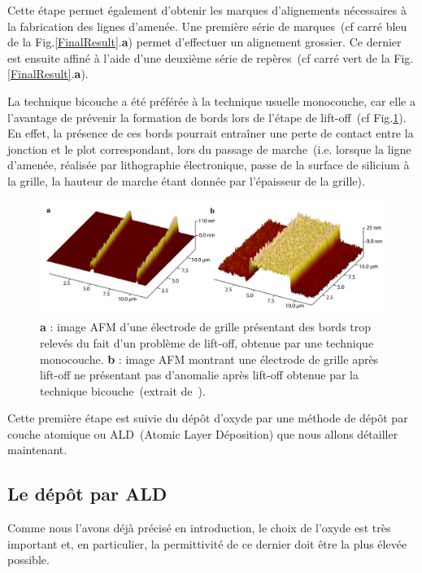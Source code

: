 Cette étape permet également d'obtenir les marques d'alignements nécessaires à la fabrication des lignes d'amenée. Une première série de marques~(cf carré bleu de la Fig.\ref{FinalResult}.\textbf{a}) permet d'effectuer un alignement grossier. Ce dernier est ensuite affiné à l'aide d'une deuxième série de repères~(cf carré vert de la Fig.\ref{FinalResult}.\textbf{a}).

La technique bicouche a été préférée à la technique usuelle monocouche, car elle a l'avantage de prévenir la formation de bords lors de l'étape de lift-off~(cf Fig.\ref{lift-off}). En effet, la présence de ces bords pourrait entraîner une perte de contact entre la jonction et le plot correspondant, lors du passage de marche~(i.e. lorsque la ligne d'amenée, réalisée par lithographie électronique, passe de la surface de silicium à la grille, la hauteur de marche étant donnée par l'épaisseur de la grille).


\begin{figure}
\centering \includegraphics[scale=0.45]{Fabrication/BatmanGrille/BatmanGrille.pdf}
\caption{\textbf{a} : image AFM d'une électrode de grille présentant des bords trop relevés du fait d'un problème de lift-off, obtenue par une technique monocouche. \textbf{b} : image AFM montrant une électrode de grille après lift-off ne présentant pas d'anomalie après lift-off obtenue par la technique bicouche~(extrait de~\cite{RochPhd}).}
\label{lift-off}
\end{figure}

Cette première étape est suivie du dépôt d'oxyde par une méthode de dépôt par couche atomique ou ALD~(Atomic Layer Déposition) que nous allons détailler maintenant.

\subsection{Le dép\^ot par ALD}

Comme nous l'avons déjà précisé en introduction, le choix de l'oxyde est très important et, en particulier, la permittivité de ce dernier doit être la plus élevée possible.

